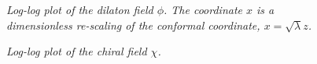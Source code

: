 \begin{figure}[htb]
\caption{\textit{Log-log plot of the dilaton field $\phi$. The coordinate $x$ is a dimensionless re-scaling of the conformal coordinate, $x=\sqrt{\lambda}z$.}}
\label{figDilaton}
\end{figure}

\begin{figure}[htb]
\caption{\textit{Log-log plot of the chiral field $\chi$. }}
\label{figChiral}
\end{figure}

